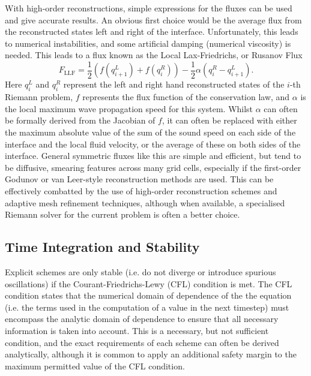 With high-order reconstructions, simple expressions for the fluxes can be used and give accurate results.
An obvious first choice would be the average flux from the reconstructed states left and right of the interface.
Unfortunately, this leads to numerical instabilities, and some artificial damping (numerical viscosity) is needed.
This leads to a flux known as the Local Lax-Friedrichs, or Rusanov Flux \citep{Rusanov1962}
\begin{equation}
    F_{\mathrm{LLF}} = \frac{1}{2}(f(q_{i+1}^L) + f(q_i^R)) - \frac{1}{2}\alpha(q_i^R - q_{i+1}^L).
\end{equation}
Here $q_i^L$ and $q_i^R$ represent the left and right hand reconstructed states of the $i$-th Riemann problem, $f$ represents the flux function of the conservation law, and $\alpha$ is the local maximum wave propagation speed for this system.
Whilst $\alpha$ can often be formally derived from the Jacobian of $f$, it can often be replaced with either the maximum absolute value of the sum of the sound speed on each side of the interface and the local fluid velocity, or the average of these on both sides of the interface.
General symmetric fluxes like this are simple and efficient, but tend to be diffusive, smearing features across many grid cells, especially if the first-order Godunov or van Leer-style reconstruction methods are used.
This can be effectively combatted by the use of high-order reconstruction schemes and adaptive mesh refinement techniques, although when available, a specialised Riemann solver for the current problem is often a better choice.

\subsection{Time Integration and Stability}\label{Sec:HydroStability}

Explicit schemes are only stable (i.e. do not diverge or introduce spurious oscillations) if the Courant-Friedrichs-Lewy (CFL) condition is met.
The CFL condition states that the numerical domain of dependence of the the equation (i.e. the terms used in the computation of a value in the next timestep) must encompass the analytic domain of dependence to ensure that all necessary information is taken into account.
This is a necessary, but not sufficient condition, and the exact requirements of each scheme can often be derived analytically, although it is common to apply an additional safety margin to the maximum permitted value of the CFL condition.

